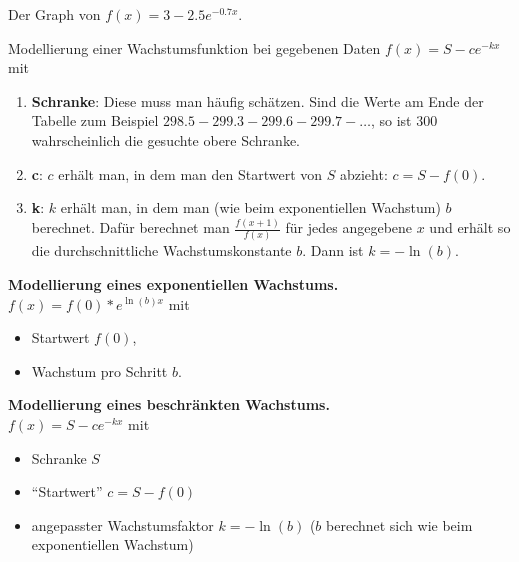 \begin{marginfigure}
  \caption{Der Graph von $f(x)=3-2.5e^{-0.7x}$.}
\end{marginfigure}

\begin{bla}{Modellierung einer Wachstumsfunktion bei gegebenen Daten}
  $f(x)=S-ce^{-kx}$ mit
  \begin{enumerate}
    \item \textbf{Schranke}: Diese muss man häufig schätzen. Sind die Werte am Ende der Tabelle zum Beispiel $298.5 - 299.3 - 299.6 - 299.7 - \dots$, so ist $300$ wahrscheinlich die gesuchte obere Schranke.
    \item \textbf{c}: $c$ erhält man, in dem man den Startwert von $S$ abzieht: $c=S-f(0)$.
    \item \textbf{k}: $k$ erhält man, in dem man (wie beim exponentiellen Wachstum) $b$ berechnet. Dafür berechnet man $\frac{f(x+1)}{f(x)}$ für jedes angegebene $x$ und erhält so die durchschnittliche Wachstumskonstante $b$. Dann ist $k=-\ln(b)$.
  \end{enumerate}
\end{bla}

\begin{koch}
  \textbf{Modellierung eines exponentiellen Wachstums.} \\
  $f(x)=f(0)*e^{\ln(b)x}$ mit
  \begin{itemize}
    \item Startwert $f(0)$,
    \item Wachstum pro Schritt $b$.
  \end{itemize}
  \textbf{Modellierung eines beschränkten Wachstums.} \\
  \( f(x) = S - ce^{-kx} \) mit
  \begin{itemize}
    \item Schranke \( S \)
    \item ``Startwert'' \( c = S - f(0) \)
    \item angepasster Wachstumsfaktor \( k = -\ln(b) \) (\( b \) berechnet sich wie beim exponentiellen Wachstum)
  \end{itemize}
\end{koch}